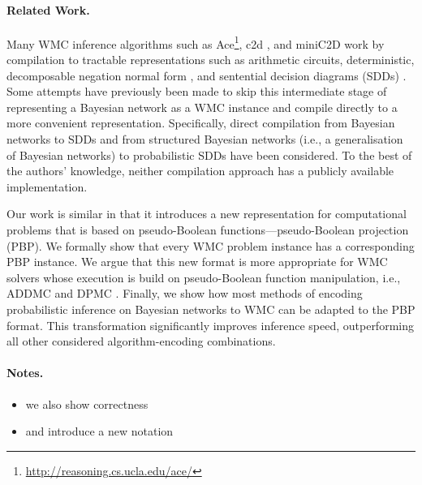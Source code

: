 \documentclass[runningheads]{llncs}
\begin{document}
\paragraph{Related Work.}
Many WMC inference algorithms such as
\textsf{Ace}\footnote{\url{http://reasoning.cs.ucla.edu/ace/}}, \textsf{c2d}
\cite{DBLP:conf/ecai/Darwiche04}, and \textsf{miniC2D}
\cite{DBLP:conf/ijcai/OztokD15} work by compilation to tractable representations
such as arithmetic circuits, deterministic, decomposable negation normal form
\cite{DBLP:journals/jancl/Darwiche01}, and sentential decision diagrams (SDDs)
\cite{DBLP:conf/ijcai/Darwiche11}. Some attempts have previously been made to
skip this intermediate stage of representing a Bayesian network as a WMC
instance and compile directly to a more convenient representation.
Specifically, direct compilation from Bayesian networks to SDDs
\cite{DBLP:conf/ecsqaru/ChoiKD13} and from structured Bayesian networks (i.e., a
generalisation of Bayesian networks) to probabilistic SDDs
\cite{shen2020modeling} have been considered. To the best of the authors'
knowledge, neither compilation approach has a publicly available implementation.

Our work is similar in that it introduces a new representation for computational
problems that is based on pseudo-Boolean functions---pseudo-Boolean projection
(PBP). We formally show that every WMC problem instance has a corresponding PBP
instance. We argue that this new format is more appropriate for WMC solvers
whose execution is build on pseudo-Boolean function manipulation, i.e.,
\textsf{ADDMC} \cite{DBLP:conf/aaai/DudekPV20} and \textsf{DPMC}
\cite{DBLP:conf/cp/DudekPV20}. Finally, we show how most methods of encoding
probabilistic inference on Bayesian networks to WMC can be adapted to the PBP
format. This transformation significantly improves inference speed,
outperforming all other considered algorithm-encoding combinations.


\paragraph{Notes.}
\begin{itemize}
\item we also show correctness
\item and introduce a new notation
\end{itemize}
\end{document}
